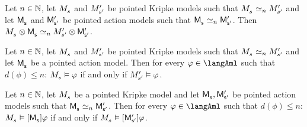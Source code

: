 \begin{proposition}
Let $n \in \mathbb{N}$,
let $\kPModel{\kStateS}$ and ${M^{\prime}_{{s}^{\prime}}}$ be pointed Kripke models such that $\kPModel{\kStateS} \bisimilar[n] \kPModelP{\kStateSP}$ and
let $\aPModel{\aStateS}$ and ${\mathsf{M}^{\prime}_{{\mathsf{{s}}^{\prime}}}}$ be pointed action models such that $\aPModel{\aStateS} \bisimilar[n] \aPModelP{\aStateSP}$.
Then $\kPModel{\kStateS} \exec \aPModel{\aStateS} \bisimilar[n] \kPModelP{\kStateSP} \exec \aPModelP{\aStateSP}$.
\end{proposition}

\begin{proposition}
Let $n \in \mathbb{N}$,
let $\kPModel{\kStateS}$ and ${M^{\prime}_{{s}^{\prime}}}$ be pointed Kripke models such that $\kPModel{\kStateS} \bisimilar[n] \kPModelP{\kStateSP}$ and
let $\aPModel{\aStateS}$ be a pointed action model.
Then for every $\phi \in \langAml$ such that $d(\phi) \leq n$: $\kPModel{\kStateS} \entails \phi$ if and only if ${M^{\prime}_{{s}^{\prime}}} \vDash \varphi$.
\end{proposition}

\begin{proposition}
Let $n \in \mathbb{N}$,
let $\kPModel{\kStateS}$ be a pointed Kripke model and
let $\aPModel{\aStateS}, \aPModelP{\aStateSP}$ be pointed action models such that $\aPModel{\aStateS} \bisimilar[n] \aPModelP{\aStateSP}$.
Then for every $\phi \in \langAml$ such that $d(\phi) \leq n$: $\kPModel{\kStateS} \entails \actionA{\aPModel{\aStateS}} \phi$ if and only if $\kPModel{\kStateS} \entails \actionA{\aPModelP{\aStateSP}} \phi$.
\end{proposition}

